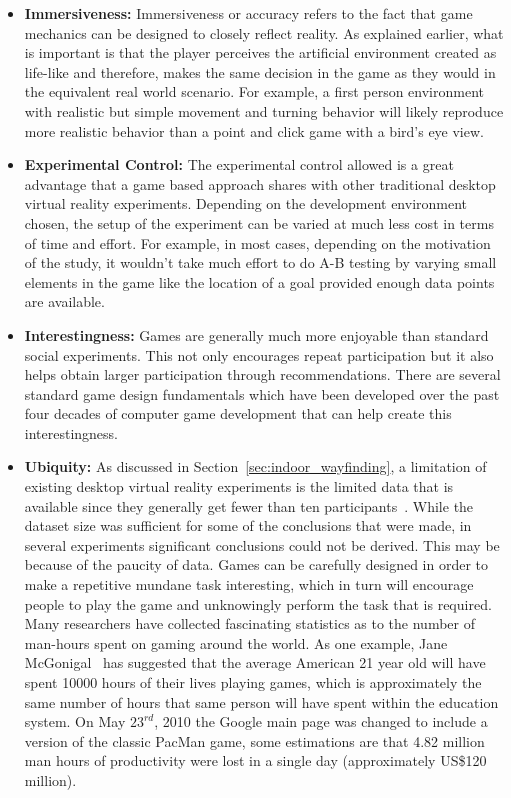 \begin{itemize}
    \item \textbf{Immersiveness:} Immersiveness or accuracy refers to the fact that game mechanics can be designed to closely reflect reality. As explained earlier,  what is important is that the player perceives the artificial environment created as life-like and therefore, makes the same decision in the game as they would in the equivalent real world scenario. For example, a first person environment with realistic but simple movement and turning behavior will likely reproduce more realistic behavior than a point and click game with a bird's eye view.
    \item \textbf{Experimental Control:} The experimental control allowed is a great advantage that a game based approach shares with other traditional desktop virtual reality experiments. Depending on the development environment chosen, the setup of the experiment can be varied at much less cost in terms of time and effort. For example, in most cases, depending on the motivation of the study, it wouldn't take much effort to do A-B testing by varying small elements in the game like the location of a goal provided enough data points are available.
    \item \textbf{Interestingness:}  Games are generally much more enjoyable than standard social experiments. This not only encourages repeat participation but it also helps obtain larger participation through recommendations. There are several standard game design fundamentals which have been developed over the past four decades of computer game development that can help create this interestingness.
    \item \textbf{Ubiquity:} As discussed in Section~\ref{sec:indoor_wayfinding}, a limitation of existing desktop virtual reality experiments is the limited data that is available since they generally get fewer than ten participants~\cite{Kuipers01012003,stankiewicz2006lost}. While the dataset size was sufficient for some of the conclusions that were made, in several experiments significant conclusions could not be derived. This may be because of the paucity of data. Games can be carefully designed in order to make a repetitive mundane task interesting, which in turn will encourage people to play the game and unknowingly perform the task that is required. Many researchers have collected fascinating statistics as to the number of man-hours spent on gaming around the world. As one example, Jane McGonigal~\cite{McgonigalVideo} has suggested that the average American 21 year old will have spent 10000 hours of their lives playing games, which is approximately the same number of hours that same person will have spent within the education system. On May $23^{rd}$, 2010 the Google main page was changed to include a version of the classic PacMan game, some estimations are that 4.82 million man hours of productivity were lost in a single day (approximately US\$120 million).
\end{itemize}
